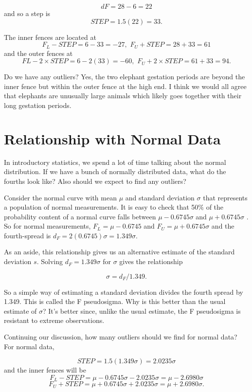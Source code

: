 \documentclass[
]{book}
\begin{document}
\[
          dF = 28 - 6 = 22
\]
and so a step is
\[
          STEP = 1.5 (22) = 33 .
\]

The inner fences are located at
\[
     F_L - STEP = 6 - 33 = -27, \, \,  F_U + STEP = 28 + 33 = 61
\]
and the outer fences at
\[
     FL - 2 \times STEP = 6 - 2(33) = -60, \, \,  F_U + 2 \times STEP = 61 + 33 = 94.
\]

Do we have any outliers? Yes, the two elephant gestation periods are beyond the inner fence but within the outer fence at the high end. I think we would all agree that elephants are unusually large animals which likely goes together with their long gestation periods.

\hypertarget{relationship-with-normal-data}{%
\section{Relationship with Normal Data}\label{relationship-with-normal-data}}

In introductory statistics, we spend a lot of time talking about the normal distribution. If we have a bunch of normally distributed data, what do the fourths look like? Also should we expect to find any outliers?

Consider the normal curve with mean \(\mu\) and standard deviation \(\sigma\) that represents a population of normal measurements. It is easy to check that 50\% of the probability content of a normal curve falls between \(\mu - 0.6745 \sigma\) and \(\mu + 0.6745 \sigma\) . So for normal measurements, \(F_L = \mu - 0.6745\) and \(F_U = \mu + 0.6745 \sigma\) and the fourth-spread is \(d_F = 2 (0.6745) \sigma = 1.349 \sigma\).

As an aside, this relationship gives us an alternative estimate of the standard deviation \(s\). Solving \(d_F = 1.349 \sigma\) for \(\sigma\) gives the relationship

\[
           \sigma = d_F / 1.349.
\]

So a simple way of estimating a standard deviation divides the fourth spread by 1.349. This is called the F pseudosigma. Why is this better than the usual estimate of \(\sigma\)? It's better since, unlike the usual estimate, the F pseudosigma is resistant to extreme observations.

Continuing our discussion, how many outliers should we find for normal data? For normal data,

\[
          STEP = 1.5 (1.349 \sigma  ) = 2.0235 \sigma  
\]
and the inner fences will be
\[
          F_L - STEP =  \mu - 0.6745 \sigma  - 2.0235 \sigma    =  \mu - 2.6980  \sigma
\]
\[
          F_U + STEP =  \mu + 0.6745 \sigma + 2.0235\sigma  =  \mu + 2.6980  \sigma.
\]
\end{document}
